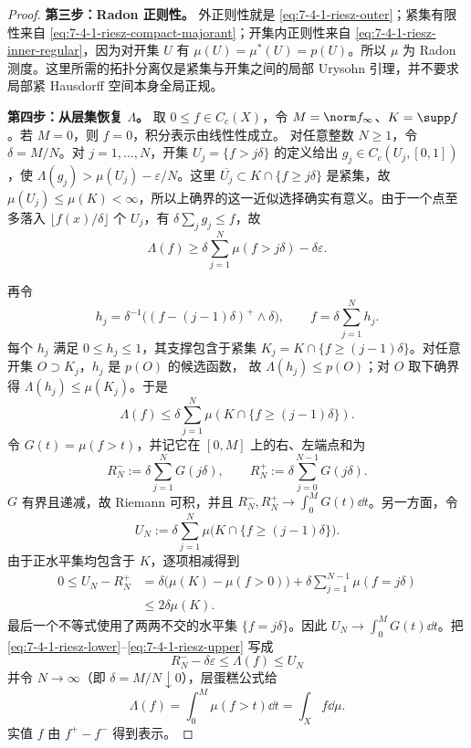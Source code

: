 \begin{proof}
\textbf{第三步：Radon 正则性。}
外正则性就是 \eqref{eq:7-4-1-riesz-outer}；紧集有限性来自
\eqref{eq:7-4-1-riesz-compact-majorant}；开集内正则性来自
\eqref{eq:7-4-1-riesz-inner-regular}，因为对开集 $U$ 有 $\mu(U)=\mu^*(U)=p(U)$。所以 $\mu$ 为
Radon 测度。这里所需的拓扑分离仅是紧集与开集之间的局部 Urysohn 引理，并不要求局部紧
Hausdorff 空间本身全局正规。

\textbf{第四步：从层集恢复 $\Lambda$。}
取 $0\le f\in C_c(X)$，令 $M=\norm f_\infty$、$K=\supp f$。若 $M=0$，则 $f=0$，积分表示由线性性成立。
对任意整数 $N\geq1$，令 $\delta=M/N$。对 $j=1,\ldots,N$，开集 $U_j=\{f>j\delta\}$ 的定义给出
$g_j\in C_c(U_j,[0,1])$，使
$\Lambda(g_j)>\mu(U_j)-\varepsilon/N$。这里
$\overline{U_j}\subset K\cap\{f\geq j\delta\}$ 是紧集，故
$\mu(U_j)\leq\mu(K)<\infty$，所以上确界的这一近似选择确实有意义。由于一个点至多落入
$\lfloor f(x)/\delta\rfloor$ 个 $U_j$，有 $\delta\sum_jg_j\le f$，故
\begin{equation}\label{eq:7-4-1-riesz-lower}
 \Lambda(f)\ge\delta\sum_{j=1}^N\mu(f>j\delta)-\delta\varepsilon.
\end{equation}

再令
\[
 h_j=\delta^{-1}\bigl((f-(j-1)\delta)^+\wedge\delta\bigr),
 \qquad f=\delta\sum_{j=1}^Nh_j.
\]
每个 $h_j$ 满足 $0\le h_j\le1$，其支撑包含于紧集
$K_j=K\cap\{f\ge(j-1)\delta\}$。对任意开集 $O\supset K_j$，$h_j$ 是 $p(O)$ 的候选函数，
故 $\Lambda(h_j)\le p(O)$；对 $O$ 取下确界得
$\Lambda(h_j)\le\mu(K_j)$。于是
\begin{equation}\label{eq:7-4-1-riesz-upper}
 \Lambda(f)\le\delta\sum_{j=1}^N\mu(K\cap\{f\ge(j-1)\delta\}).
\end{equation}
令 $G(t)=\mu(f>t)$，并记它在 $[0,M]$ 上的右、左端点和为
\[
 R_N^-:=\delta\sum_{j=1}^NG(j\delta),
 \qquad
 R_N^+:=\delta\sum_{j=0}^{N-1}G(j\delta).
\]
$G$ 有界且递减，故 Riemann 可积，并且
$R_N^-,R_N^+\to\int_0^MG(t)\dd t$。另一方面，令
\[
 U_N:=\delta\sum_{j=1}^N\mu\bigl(K\cap\{f\ge(j-1)\delta\}\bigr).
\]
由于正水平集均包含于 $K$，逐项相减得到
\begin{align*}
 0\le U_N-R_N^+
 &=\delta\bigl(\mu(K)-\mu(f>0)\bigr)
   +\delta\sum_{j=1}^{N-1}\mu(f=j\delta)\\
 &\le2\delta\mu(K).
\end{align*}
最后一个不等式使用了两两不交的水平集
$\{f=j\delta\}$。因此 $U_N\to\int_0^MG(t)\dd t$。把
\eqref{eq:7-4-1-riesz-lower}--\eqref{eq:7-4-1-riesz-upper} 写成
\[
 R_N^- -\delta\varepsilon\le\Lambda(f)\le U_N
\]
并令 $N\to\infty$（即 $\delta=M/N\downarrow0$），层蛋糕公式给
\[
 \Lambda(f)=\int_0^M\mu(f>t)\dd t=\int_Xf\dd\mu.
\]
实值 $f$ 由 $f^+-f^-$ 得到表示。


\end{proof}
